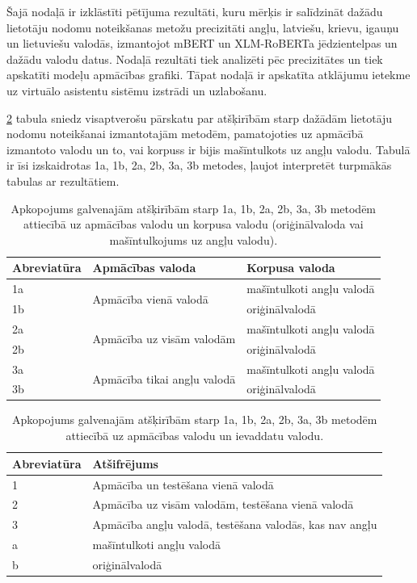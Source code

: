 
Šajā nodaļā ir izklāstīti pētījuma rezultāti, kuru mērķis ir salīdzināt dažādu lietotāju nodomu noteikšanas metožu precizitāti angļu, latviešu, krievu, igauņu un lietuviešu valodās, izmantojot mBERT un XLM-RoBERTa jēdzientelpas un dažādu valodu datus. Nodaļā rezultāti tiek analizēti pēc precizitātes un tiek apskatīti modeļu apmācības grafiki. Tāpat nodaļā ir apskatīta atklājumu ietekme uz virtuālo asistentu sistēmu izstrādi un uzlabošanu.

\ref{tab:legend} tabula sniedz visaptverošu pārskatu par atšķirībām starp dažādām lietotāju nodomu noteikšanai izmantotajām metodēm, pamatojoties uz apmācībā izmantoto valodu un to, vai korpuss ir bijis mašīntulkots uz angļu valodu. Tabulā ir īsi izskaidrotas 1a, 1b, 2a, 2b, 3a, 3b metodes, ļaujot interpretēt turpmākās tabulas ar rezultātiem.


\begin{table}[htbp]
  \centering
  \caption{Apkopojums galvenajām atšķirībām starp 1a, 1b, 2a, 2b, 3a, 3b metodēm attiecībā uz apmācības valodu un korpusa valodu (oriģinālvaloda vai mašīntulkojums uz angļu valodu).}
    \begin{tabular}{lll}\toprule
    Abreviatūra & Apmācības valoda & Korpusa valoda \\\midrule
    1a    & \multicolumn{1}{l}{\multirow{2}[0]{*}{Apmācība vienā valodā}} & mašīntulkoti angļu valodā \\
    1b    &       & oriģinālvalodā \\\midrule
    2a    & \multicolumn{1}{l}{\multirow{2}[0]{*}{Apmācība uz visām valodām}} & mašīntulkoti angļu valodā \\
    2b    &       & oriģinālvalodā \\\midrule
    3a    & \multicolumn{1}{l}{\multirow{2}[0]{*}{Apmācība tikai angļu valodā}} & mašīntulkoti angļu valodā \\
    3b    &       & oriģinālvalodā \\\bottomrule
    \end{tabular}%
  \label{tab:legend}%
\end{table}%


\begin{table}[htbp]
  \centering
  \caption{Apkopojums galvenajām atšķirībām starp 1a, 1b, 2a, 2b, 3a, 3b metodēm attiecībā uz apmācības valodu un ievaddatu valodu.}
    \begin{tabular}{ll}\toprule
    Abreviatūra & Atšifrējums \\\midrule
    1 & Apmācība un testēšana vienā valodā \\
    2 & Apmācība uz visām valodām, testēšana vienā valodā \\
    3 & Apmācība angļu valodā, testēšana valodās, kas nav angļu \\\midrule
    a & mašīntulkoti angļu valodā \\
    b & oriģinālvalodā \\\bottomrule
    \end{tabular}%
  \label{tab:legend}%
\end{table}%



